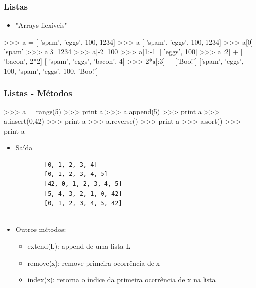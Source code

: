 \documentclass[12pt,t,graphics]{beamer}
\newcommand{\ft}[1]{\frametitle{#1}}
\newcommand{\bi}{\begin{itemize}}
\newcommand{\ei}{\end{itemize}}
\begin{document}

\begin{frame}[fragile]
  \ft{Listas}
  \bi
\item "Arrays flexíveis"
  \ei
  \begin{python}
    >>> a = [ 'spam', 'eggs', 100, 1234]
    >>> a
    [ 'spam', 'eggs', 100, 1234]
    >>> a[0]
    'spam'
    >>> a[3]
    1234
    >>> a[-2]
    100
    >>> a[1:-1]
    [ 'eggs', 100]
    >>> a[:2] + [ 'bacon', 2*2]
    [ 'spam', 'eggs', 'bacon', 4]
    >>> 2*a[:3] + ['Boo!']
    ['spam', 'eggs', 100, 'spam', 'eggs', 100, 'Boo!']		
  \end{python}	
\end{frame}


\begin{frame}[fragile]
  \ft{Listas - Métodos }
  \begin{python}
    >>> a = range(5)
    >>> print a
    >>> a.append(5)
    >>> print a
    >>> a.insert(0,42)
    >>> print a
    >>> a.reverse()
    >>> print a
    >>> a.sort()
    >>> print a	
  \end{python}	
  \bi
\item Saída
  \begin{scriptsize}
\begin{verbatim}
		[0, 1, 2, 3, 4]
		[0, 1, 2, 3, 4, 5]
		[42, 0, 1, 2, 3, 4, 5]
		[5, 4, 3, 2, 1, 0, 42]
		[0, 1, 2, 3, 4, 5, 42]
		
\end{verbatim}
  \end{scriptsize}	
\item Outros métodos:
  \bi
\item extend(L): append de uma lista L
\item remove(x): remove primeira ocorrência de x
\item index(x): retorna o índice da primeira ocorrência de x na lista
  \ei
  \ei	
\end{frame}

\end{document}
